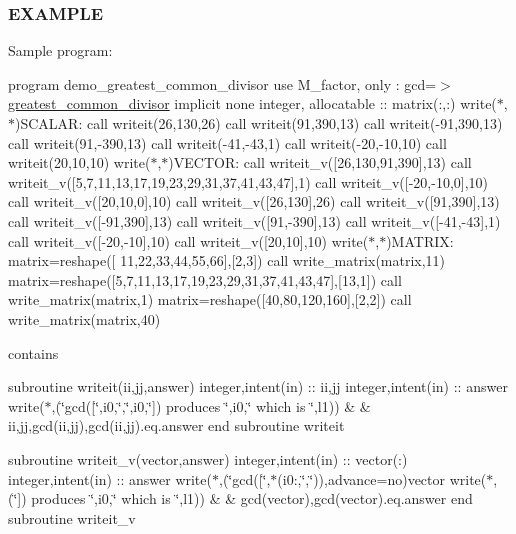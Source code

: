 \subsubsection*{E\+X\+A\+M\+P\+LE}

Sample program\+:

program demo\+\_\+greatest\+\_\+common\+\_\+divisor use M\+\_\+factor, only \+: gcd=$>$\hyperlink{interfacem__factor_1_1greatest__common__divisor}{greatest\+\_\+common\+\_\+divisor} implicit none integer, allocatable \+:\+: matrix(\+:,\+:) write($\ast$,$\ast$)\textquotesingle{}S\+C\+A\+L\+AR\+:\textquotesingle{} call writeit(26,130,26) call writeit(91,390,13) call writeit(-\/91,390,13) call writeit(91,-\/390,13) call writeit(-\/41,-\/43,1) call writeit(-\/20,-\/10,10) call writeit(20,10,10) write($\ast$,$\ast$)\textquotesingle{}V\+E\+C\+T\+OR\+:\textquotesingle{} call writeit\+\_\+v(\mbox{[}26,130,91,390\mbox{]},13) call writeit\+\_\+v(\mbox{[}5,7,11,13,17,19,23,29,31,37,41,43,47\mbox{]},1) call writeit\+\_\+v(\mbox{[}-\/20,-\/10,0\mbox{]},10) call writeit\+\_\+v(\mbox{[}20,10,0\mbox{]},10) call writeit\+\_\+v(\mbox{[}26,130\mbox{]},26) call writeit\+\_\+v(\mbox{[}91,390\mbox{]},13) call writeit\+\_\+v(\mbox{[}-\/91,390\mbox{]},13) call writeit\+\_\+v(\mbox{[}91,-\/390\mbox{]},13) call writeit\+\_\+v(\mbox{[}-\/41,-\/43\mbox{]},1) call writeit\+\_\+v(\mbox{[}-\/20,-\/10\mbox{]},10) call writeit\+\_\+v(\mbox{[}20,10\mbox{]},10) write($\ast$,$\ast$)\textquotesingle{}M\+A\+T\+R\+IX\+:\textquotesingle{} matrix=reshape(\mbox{[} 11,22,33,44,55,66\mbox{]},\mbox{[}2,3\mbox{]}) call write\+\_\+matrix(matrix,11) matrix=reshape(\mbox{[}5,7,11,13,17,19,23,29,31,37,41,43,47\mbox{]},\mbox{[}13,1\mbox{]}) call write\+\_\+matrix(matrix,1) matrix=reshape(\mbox{[}40,80,120,160\mbox{]},\mbox{[}2,2\mbox{]}) call write\+\_\+matrix(matrix,40)

contains

subroutine writeit(ii,jj,answer) integer,intent(in) \+:\+: ii,jj integer,intent(in) \+:\+: answer write($\ast$,\textquotesingle{}(\char`\"{}gcd(\mbox{[}\char`\"{},i0,\char`\"{},\char`\"{},i0,\char`\"{}\mbox{]}) produces \char`\"{},i0,\char`\"{} which is \char`\"{},l1)\textquotesingle{}) \& \& ii,jj,gcd(ii,jj),gcd(ii,jj).eq.\+answer end subroutine writeit

subroutine writeit\+\_\+v(vector,answer) integer,intent(in) \+:\+: vector(\+:) integer,intent(in) \+:\+: answer write($\ast$,\textquotesingle{}(\char`\"{}gcd(\mbox{[}\char`\"{},$\ast$(i0\+:,\char`\"{},\char`\"{}))\textquotesingle{},advance=\textquotesingle{}no\textquotesingle{})vector write($\ast$,\textquotesingle{}(\char`\"{}\mbox{]}) produces \char`\"{},i0,\char`\"{} which is \char`\"{},l1)\textquotesingle{}) \& \& gcd(vector),gcd(vector).eq.\+answer end subroutine writeit\+\_\+v

